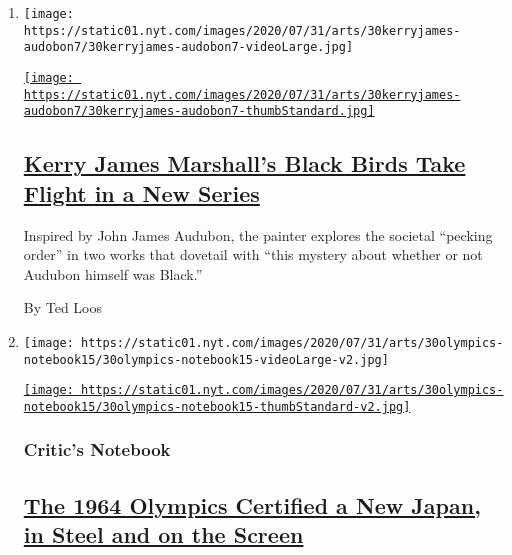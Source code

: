 \begin{enumerate}
\def\labelenumi{\arabic{enumi}.}
\item
  \texttt{[image: https://static01.nyt.com/images/2020/07/31/arts/30kerryjames-audobon7/30kerryjames-audobon7-videoLarge.jpg]}

  \href{/2020/07/29/arts/design/kerry-james-marshall-audubon.html}{\texttt{[image: https://static01.nyt.com/images/2020/07/31/arts/30kerryjames-audobon7/30kerryjames-audobon7-thumbStandard.jpg]}}

  \hypertarget{kerry-james-marshalls-black-birds-take-flight-in-a-new-series}{%
  \subsection{\texorpdfstring{\href{/2020/07/29/arts/design/kerry-james-marshall-audubon.html}{Kerry
  James Marshall's Black Birds Take Flight in a New
  Series}}{Kerry James Marshall's Black Birds Take Flight in a New Series}}\label{kerry-james-marshalls-black-birds-take-flight-in-a-new-series}}

  Inspired by John James Audubon, the painter explores the societal
  ``pecking order'' in two works that dovetail with ``this mystery about
  whether or not Audubon himself was Black.''

  By Ted Loos
\item
  \texttt{[image: https://static01.nyt.com/images/2020/07/31/arts/30olympics-notebook15/30olympics-notebook15-videoLarge-v2.jpg]}

  \href{/2020/07/30/arts/design/tokyo-olympics-1964-design.html}{\texttt{[image: https://static01.nyt.com/images/2020/07/31/arts/30olympics-notebook15/30olympics-notebook15-thumbStandard-v2.jpg]}}

  \hypertarget{critics-notebook}{%
  \subsubsection{Critic's Notebook}\label{critics-notebook}}

  \hypertarget{the-1964-olympics-certified-a-new-japan-in-steel-and-on-the-screen}{%
  \subsection{\texorpdfstring{\href{/2020/07/30/arts/design/tokyo-olympics-1964-design.html}{The
  1964 Olympics Certified a New Japan, in Steel and on the
  Screen}}{The 1964 Olympics Certified a New Japan, in Steel and on the Screen}}\label{the-1964-olympics-certified-a-new-japan-in-steel-and-on-the-screen}}


\end{enumerate}
